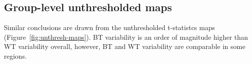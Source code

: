 \documentclass[conference]{IEEEtran}
\begin{document}
\subsection{Group-level unthresholded maps}

Similar conclusions are drawn from the unthresholded t-statistcs maps
(Figure~\ref{fig:unthresh-maps}). BT variability is an order of magnitude
higher than WT variability overall, however, BT and WT variability are
comparable in some regions. 


\begin{figure}[ht]
  \end{figure}
\end{document}

